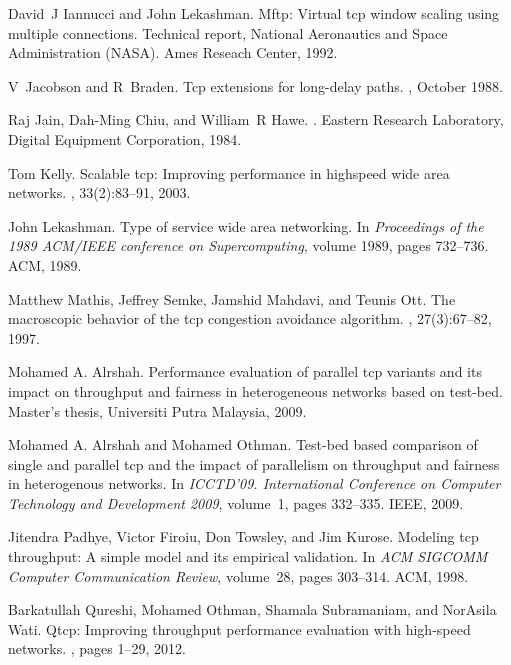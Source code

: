 \documentclass[a4paper, conference]{IEEEtran}
\begin{document}
\begin{thebibliography}{10}
David~J Iannucci and John Lekashman.
\newblock Mftp: Virtual tcp window scaling using multiple connections.
\newblock Technical report, National Aeronautics and Space Administration
  (NASA). Ames Reseach Center, 1992.

V~Jacobson and R~Braden.
\newblock Tcp extensions for long-delay paths.
, October 1988.

Raj Jain, Dah-Ming Chiu, and William~R Hawe.
.
\newblock Eastern Research Laboratory, Digital Equipment Corporation, 1984.

Tom Kelly.
\newblock Scalable tcp: Improving performance in highspeed wide area networks.
, 33(2):83--91, 2003.

John Lekashman.
\newblock Type of service wide area networking.
\newblock In {\em Proceedings of the 1989 ACM/IEEE conference on
  Supercomputing}, volume 1989, pages 732--736. ACM, 1989.

Matthew Mathis, Jeffrey Semke, Jamshid Mahdavi, and Teunis Ott.
\newblock The macroscopic behavior of the tcp congestion avoidance algorithm.
, 27(3):67--82, 1997.

{Mohamed A. Alrshah}.
\newblock Performance evaluation of parallel tcp variants and its impact on
  throughput and fairness in heterogeneous networks based on test-bed.
\newblock Master's thesis, Universiti Putra Malaysia, 2009.

{Mohamed A. Alrshah and Mohamed Othman}.
\newblock Test-bed based comparison of single and parallel tcp and the impact
  of parallelism on throughput and fairness in heterogenous networks.
\newblock In {\em ICCTD'09. International Conference on Computer Technology and
  Development 2009}, volume~1, pages 332--335. IEEE, 2009.

Jitendra Padhye, Victor Firoiu, Don Towsley, and Jim Kurose.
\newblock Modeling tcp throughput: A simple model and its empirical validation.
\newblock In {\em ACM SIGCOMM Computer Communication Review}, volume~28, pages
  303--314. ACM, 1998.

Barkatullah Qureshi, Mohamed Othman, Shamala Subramaniam, and NorAsila Wati.
\newblock Qtcp: Improving throughput performance evaluation with high-speed
  networks.
, pages 1--29, 2012.


\end{thebibliography}
\end{document}
